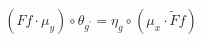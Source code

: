 \begin{equation}
  (Ff\cdot\mu_y)\circ\theta_{g^\prime} = \eta_{g}\circ(\mu_x\cdot\tilde Ff)
\end{equation}

